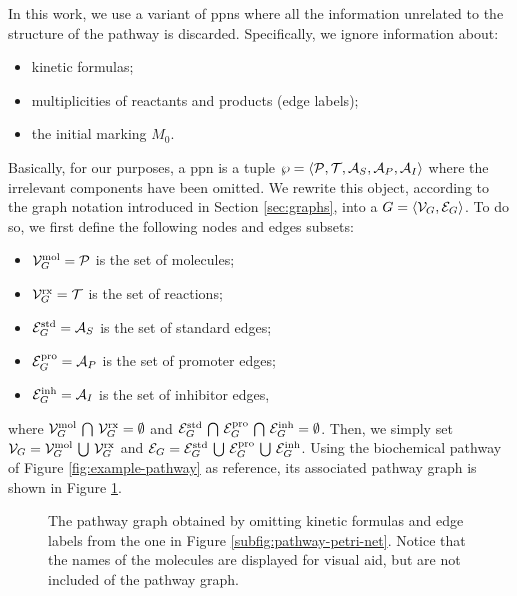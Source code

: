 In this work, we use a variant of \glspl{ppn} where all the information unrelated to the structure of the pathway is discarded. Specifically, we ignore information about:
\begin{itemize}
    \item kinetic formulas;
    \item multiplicities of reactants and products (\ie edge labels);
    \item the initial marking $M_0$.
\end{itemize}
Basically, for our purposes, a \gls{ppn} is a tuple $\wp = \Tuple{\Cal{P},\Cal{T},\Cal{A}_{S}, \Cal{A}_{P},\Cal{A}_{I}}$ where the irrelevant components have been omitted. We rewrite this object, according to the graph notation introduced in Section \ref{sec:graphs}, into a  $G = \Tuple{\Cal{V}_G, \Cal{E}_G}$. To do so, we first define the following nodes and edges subsets:
\begin{itemize}
    \item $\Cal{V}_{G}^{\Fun{mol}} = \Cal{P}$ is the set of molecules;
    \item $\Cal{V}_{G}^{\Fun{rx}} = \Cal{T}$ is the set of reactions;
    \item $\Cal{E}_{G}^{\Fun{std}} = \Cal{A}_S$ is the set of standard edges;
    \item $\Cal{E}_{G}^{\Fun{pro}} = \Cal{A}_P$ is the set of promoter edges;
    \item $\Cal{E}_{G}^{\Fun{inh}} = \Cal{A}_I$ is the set of inhibitor edges,
\end{itemize}
where $\Cal{V}_{G}^{\Fun{mol}} \Inter \Cal{V}_{G}^{\Fun{rx}} = \emptyset$ and $\Cal{E}_{G}^{\Fun{std}} \Inter \Cal{E}_{G}^{\Fun{pro}} \Inter \Cal{E}_{G}^{\Fun{inh}} = \emptyset$. Then, we simply set $\Cal{V}_G = \Cal{V}_G^{\Fun{mol}} \Union \Cal{V}_G^{\Fun{rx}}$ and $\Cal{E}_G = \Cal{E}_G^{\Fun{std}} \Union \Cal{E}_G^{\Fun{pro}} \Union \Cal{E}_G^{\Fun{inh}}$.
Using the biochemical pathway of Figure \ref{fig:example-pathway} as reference, its associated pathway graph is shown in Figure \ref{fig:pathway-graph}.
\begin{figure}[h!]
    \centering
    \resizebox{.6\textwidth}{!}{}
    \caption{The pathway graph obtained by omitting kinetic formulas and edge labels from the one in Figure \ref{subfig:pathway-petri-net}. Notice that the names of the molecules are displayed for visual aid, but are not included of the pathway graph.}
    \label{fig:pathway-graph}
\end{figure}
